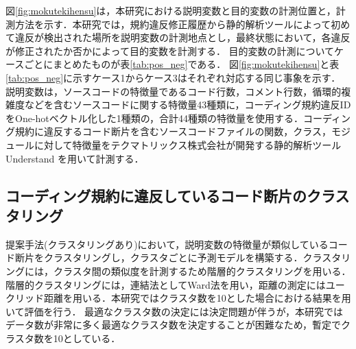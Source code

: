 \documentclass[submit,noauthor,ses,dvipdfmx]{ipsj}
\begin{document}
図\ref{fig:mokutekihensu}は，本研究における説明変数と目的変数の計測位置と，計測方法を示す．本研究では，規約違反修正履歴から静的解析ツールによって初めて違反が検出された場所を説明変数の計測地点とし，最終状態において，各違反が修正されたか否かによって目的変数を計測する．
目的変数の計測についてケースごとにまとめたものが表\ref{tab:pos_neg}である．
図\ref{fig:mokutekihensu}と表\ref{tab:pos_neg}に示すケース1からケース3はそれぞれ対応する同じ事象を示す．
説明変数は，ソースコードの特徴量であるコード行数，コメント行数，循環的複雑度などを含むソースコードに関する特徴量43種類に，コーディング規約違反IDをOne-hotベクトル化した1種類の，合計44種類の特徴量を使用する．コーディング規約に違反するコード断片を含むソースコードファイルの関数，クラス，モジュールに対して特徴量をテクマトリックス株式会社が開発する静的解析ツールUnderstand
を用いて計測する．




\begin{table}[t]
    \centering
    \caption{正例と負例の分類}
    \label{tab:pos_neg}
\end{table}

\subsection{コーディング規約に違反しているコード断片のクラスタリング}


提案手法(クラスタリングあり)において，説明変数の特徴量が類似しているコード断片をクラスタリングし，クラスタごとに予測モデルを構築する．クラスタリングには，クラスタ間の類似度を計測するため階層的クラスタリングを用いる．階層的クラスタリングには，連結法としてWard法を用い，距離の測定にはユークリッド距離を用いる\cite{ward}．本研究ではクラスタ数を10とした場合における結果を用いて評価を行う．
最適なクラスタ数の決定には決定問題が伴うが，本研究ではデータ数が非常に多く最適なクラスタ数を決定することが困難なため，暫定でクラスタ数を10としている．
\end{document}
